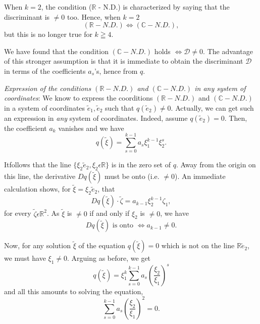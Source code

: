 \begin{remark}\label{chap2-rem2.1}
When $k = 2$, the condition ($\mathbb{R}$ - N.D.) is characterized by saying that the discriminant is $\neq 0$ too. Hence, when $k = 2$
\begin{equation*}
(\mathbb{R}-N.D.) \Leftrightarrow (\mathbb{C}-N.D.),\tag{2.9}\label{chap2-eq2.9}
\end{equation*}
but this is no longer true for $k \geqq 4$.
\end{remark}

We have found that the condition $(\mathbb{C}-N.D.)$ holds $\Leftrightarrow \mathscr{D} \neq 0$. The advantage of this stronger assumption is that it is immediate to obtain the discriminant $\mathscr{D}$ in terms of the coefficients $a_{s}$'s, hence from $q$.

{\em Expression of the conditions $(\mathbb{R}-N.D.)$ and $(\mathbb{C}-N.D.)$ in any system of coordinates}: We know to express the coorditions $(\mathbb{R}-N.D.)$ and $(\mathbb{C}-N.D.)$ in a system of coordinates $\widetilde{e}_{1}, \widetilde{e}_{2}$ such that $q(\widetilde{e}_{2}) \neq 0$. Actually, we can get such an expression in {\em any} system of coordinates. Indeed, assume $q(\widetilde{e}_{2}) = 0$. Then, the coefficient $a_{k}$ vanishes and we have
\begin{equation*}
q(\widetilde{\xi}) = \sum\limits_{s=0}^{k-1} a_{s} \xi_{1}^{k-1} \xi_{2}^{s}.\tag{2.10}\label{chap2-eq2.10}
\end{equation*}

It\pageoriginale follows that the line $\{\xi_{2} \widetilde{e}_{2}, \xi_{2} \epsilon \mathbb{R} \}$ is in the zero set of $q$. Away from the origin on this line, the derivative $Dq(\widetilde{\xi})$ must be onto (i.e. $\neq 0$). An immediate calculation shows, for $\widetilde{\xi} = \xi_{2} \widetilde{e}_{2}$, that
\begin{equation*}
Dq(\widetilde{\xi}) \cdot \widetilde{\zeta} = a_{k-1} \xi_{2}^{k-1} \zeta_{1},\tag{2.11}\label{chap2-eq2.11}
\end{equation*}
for every $\widetilde{\zeta} \epsilon \mathbb{R}^{2}$. As $\widetilde{\xi}$ is $\neq 0$ if and only if $\xi_{2}$ is $\neq 0$, we have
$$
Dq(\widetilde{\xi}) \text{ is onto } \Leftrightarrow a_{k-1} \neq 0.
$$

Now, for any solution $\widetilde{\xi}$ of the equation $q(\widetilde{\xi}) = 0$ which is not on the line $\mathbb{R}\tilde{e}_{2}$, we must have $\xi_{1} \neq 0$. Arguing as before, we get
$$
q(\widetilde{\xi}) = \xi_{1}^{k} \sum\limits_{s=0}^{k-1} a_{s} \left(\frac{\xi_{2}}{\xi_{1}}\right)^{s}
$$
and all this amounts to solving the equation,
$$
\sum\limits_{s=0}^{k-1} a_{s} \left(\frac{\xi_{2}}{\xi_{1}}\right)^2 = 0.
$$

